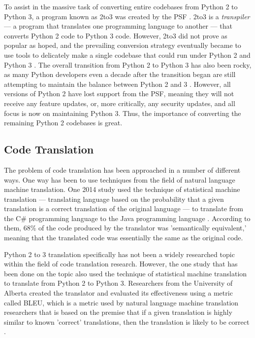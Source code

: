To assist in the massive task of converting entire codebases from Python 2 to Python 3, a program known as 2to3 was created by the PSF \autocite{2to3}. 2to3 is a \textit{transpiler} --- a program that translates one programming language to another --- that converts Python 2 code to Python 3 code. However, 2to3 did not prove as popular as hoped, and the prevailing conversion strategy eventually became to use tools to delicately make a single codebase that could run under Python 2 and Python 3 \autocite{Malloy}. The overall transition from Python 2 to Python 3 has also been rocky, as many Python developers even a decade after the transition began are still attempting to maintain the balance between Python 2 and 3 \autocite{Malloy}. However, all versions of Python 2 have lost support from the PSF, meaning they will not receive any feature updates, or, more critically, any security updates, and all focus is now on maintaining Python 3. Thus, the importance of converting the remaining Python 2 codebases is great.

\subsection{Code Translation}
The problem of code translation has been approached in a number of different ways. One way has been to use techniques from the field of natural language machine translation. One 2014 study used the technique of statistical machine translation --- translating language based on the probability that a given translation is a correct translation of the original language --- to translate from the C\# programming language to the Java programming language \autocite{Karaivanov}. According to them, 68\% of the code produced by the translator was 'semantically equivalent,' meaning that the translated code was essentially the same as the original code.

Python 2 to 3 translation specifically has not been a widely researched topic within the field of code translation research. However, the one study that has been done on the topic also used the technique of statistical machine translation to translate from Python 2 to Python 3. Researchers from the University of Alberta created the translator and evaluated its effectiveness using a metric called BLEU, which is a metric used by natural language machine translation researchers that is based on the premise that if a given translation is highly similar to known 'correct' translations, then the translation is likely to be correct \autocite{Aggarwal}.

